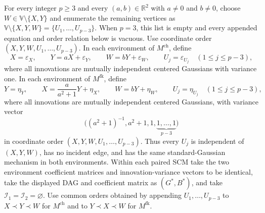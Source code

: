 For every integer \(p\ge3\) and every \((a,b)\in\mathbb R^2\) with \(a\neq0\) and \(b\neq0\), choose \(W\in\mathbb V\setminus\{X,Y\}\) and enumerate the remaining vertices as \(\mathbb V\setminus\{X,Y,W\}=\{U_1,\ldots,U_{p-3}\}\).  When \(p=3\), this list is empty and every appended equation and order relation below is vacuous.  Use coordinate order \((X,Y,W,U_1,\ldots,U_{p-3})\).  In each environment of \(M^{\mathrm{ch}}\), define
\[
 X=\varepsilon_X,\qquad Y=aX+\varepsilon_Y,\qquad W=bY+\varepsilon_W,
 \qquad U_j=\varepsilon_{U_j}\quad(1\le j\le p-3),
\]
where all innovations are mutually independent centered Gaussians with variance one.  In each environment of \(M^{\mathrm{fk}}\), define
\[
 Y=\eta_Y,\qquad X=\frac{a}{a^2+1}Y+\eta_X,\qquad W=bY+\eta_W,
 \qquad U_j=\eta_{U_j}\quad(1\le j\le p-3),
\]
where all innovations are mutually independent centered Gaussians, with variance vector
\[
 \bigl((a^2+1)^{-1},a^2+1,1,\underbrace{1,\ldots,1}_{p-3}\bigr)
\]
in coordinate order \((X,Y,W,U_1,\ldots,U_{p-3})\).  Thus every \(U_j\) is independent of \((X,Y,W)\), has no incident edge, and has the same standard-Gaussian mechanism in both environments.  Within each paired SCM take the two environment coefficient matrices and innovation-variance vectors to be identical, take the displayed DAG and coefficient matrix as \((G^*,B^*)\), and take \(\mathcal I_1=\mathcal I_2=\varnothing\).  Use common orders obtained by appending \(U_1,\ldots,U_{p-3}\) to \(X\prec Y\prec W\) for \(M^{\mathrm{ch}}\) and to \(Y\prec X\prec W\) for \(M^{\mathrm{fk}}\).